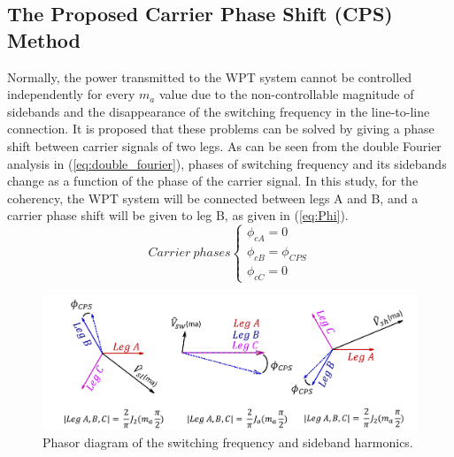 \documentclass[journal]{IEEEtran}
\begin{document}
\subsection{The Proposed Carrier Phase Shift (CPS) Method}
Normally, the power transmitted to the WPT system cannot be controlled independently for every $ m_a$ value  due to the non-controllable magnitude of sidebands and the disappearance of the switching frequency in the line-to-line connection.
It is proposed that these problems can be solved by giving a phase shift between carrier signals of two legs. As can be seen from the double Fourier analysis in (\ref{eq:double_fourier}), phases of switching frequency and its sidebands change as a function of the phase of the carrier signal. 
In this study, for the coherency,  the WPT system will be connected between legs A and B, and a carrier phase shift will be given to leg B, as given in (\ref{eq:Phi}).
\begin{equation}
\label{eq:Phi}
Carrier \ phases 
 \begin{cases}
      \phi_{cA}= 0\\
       \phi_{cB}= \phi_{CPS}\\
      \phi_{cC}= 0
\end{cases}    
\end{equation}
\begin{figure}[h]
\centering
     \includegraphics[width=1\linewidth]{phasor.png}
  \caption{ Phasor diagram of the switching frequency and sideband harmonics.}
    \label{fig:phasor}
\end{figure}
\end{document}
